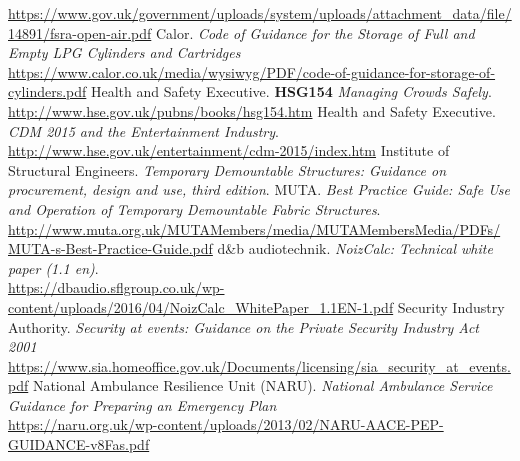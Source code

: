 \begin{thebibliography}{18}
    \href{https://www.gov.uk/government/uploads/system/uploads/attachment\_data/file/14891/fsra-open-air.pdf}{https://www.gov.uk/government/uploads/system/uploads/attachment\_data/file/14891/fsra-open-air.pdf}
    Calor.
    \textit{Code of Guidance for the Storage of Full and Empty LPG Cylinders and Cartridges}
    \href{https://www.calor.co.uk/media/wysiwyg/PDF/code-of-guidance-for-storage-of-cylinders.pdf}{https://www.calor.co.uk/media/wysiwyg/PDF/code-of-guidance-for-storage-of-cylinders.pdf}
    Health and Safety Executive.
    \textbf{HSG154} \textit{Managing Crowds Safely}. \\
    \href{http://www.hse.gov.uk/pubns/books/hsg154.htm}{http://www.hse.gov.uk/pubns/books/hsg154.htm}
    Health and Safety Executive.
    \textit{CDM 2015 and the Entertainment Industry}. \\
    \href{http://www.hse.gov.uk/entertainment/cdm-2015/index.htm}{http://www.hse.gov.uk/entertainment/cdm-2015/index.htm}
    Institute of Structural Engineers.
    \textit{Temporary Demountable Structures: Guidance on procurement, design and use, third edition}.
    MUTA.
    \textit{Best Practice Guide: Safe Use and Operation of Temporary Demountable Fabric Structures}. \\
    \href{http://www.muta.org.uk/MUTAMembers/media/MUTAMembersMedia/PDFs/MUTA-s-Best-Practice-Guide.pdf}{http://www.muta.org.uk/MUTAMembers/media/MUTAMembersMedia/PDFs/MUTA-s-Best-Practice-Guide.pdf}
    d\&b audiotechnik.
    \textit{NoizCalc: Technical white paper (1.1 en)}. \\
    \href{https://dbaudio.sflgroup.co.uk/wp-content/uploads/2016/04/NoizCalc_WhitePaper_1.1EN-1.pdf}{https://dbaudio.sflgroup.co.uk/wp-content/uploads/2016/04/NoizCalc\_WhitePaper\_1.1EN-1.pdf}
    Security Industry Authority.
    \textit{Security at events: Guidance on the Private Security Industry Act 2001} \\
    \href{https://www.sia.homeoffice.gov.uk/Documents/licensing/sia\_security\_at\_events.pdf}{https://www.sia.homeoffice.gov.uk/Documents/licensing/sia\_security\_at\_events.pdf}
    National Ambulance Resilience Unit (NARU).
    \textit{National Ambulance Service Guidance for Preparing an Emergency Plan} \\
    \href{https://naru.org.uk/wp-content/uploads/2013/02/NARU-AACE-PEP-GUIDANCE-v8Fas.pdf}{https://naru.org.uk/wp-content/uploads/2013/02/NARU-AACE-PEP-GUIDANCE-v8Fas.pdf}
\end{thebibliography}
